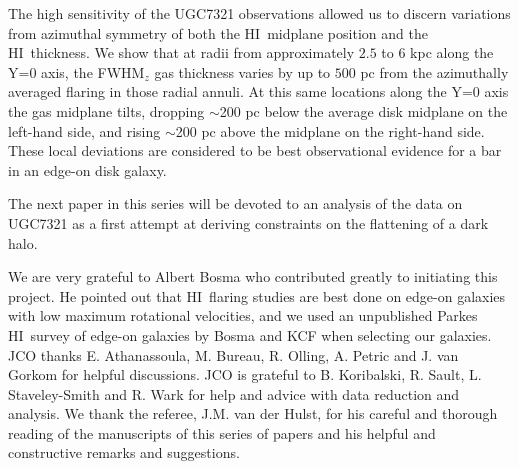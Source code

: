 \documentclass[traditabstract]{aa} %
\newcommand\HI{H{\small I}}
\begin{document}
The high sensitivity of the UGC7321 observations allowed us to discern
variations from azimuthal symmetry of both the \HI\ midplane position
and the \HI\ thickness. We show that at radii from
approximately $2.5$ to $6$ kpc along the Y=0 axis, the FWHM$_z$ gas thickness
varies by up to $500$ pc from the azimuthally averaged flaring in
those radial annuli. At this same locations along the Y=0
axis the gas midplane tilts, dropping $\sim$200 pc below the average
disk midplane on the left-hand side, and rising $\sim$200 pc above the
midplane on the right-hand side. These local deviations are considered to
be best observational evidence for a bar in an edge-on disk galaxy.

The next paper in this series will be devoted to an analysis of the data
on UGC7321 as a first attempt at deriving constraints on the
flattening of a dark halo. 

\begin{acknowledgements}

We are very grateful to Albert Bosma who contributed greatly to
initiating this project. He pointed out that \HI\ flaring studies are
best done on edge-on galaxies with low maximum rotational velocities,
and we used an unpublished Parkes \HI\ survey of edge-on galaxies by
Bosma and KCF when selecting our galaxies.  JCO thanks E. Athanassoula,
M.  Bureau, R.  Olling, A. Petric and J. van Gorkom for helpful
discussions.  JCO is grateful to B. Koribalski, R. Sault, L.
Staveley-Smith and R.  Wark for help and advice with data reduction and
analysis.
We thank the referee, J.M. van der Hulst, for
his careful and  thorough reading of the manuscripts of this series of papers and
his helpful and constructive remarks and suggestions.



\end{acknowledgements}
\end{document}
